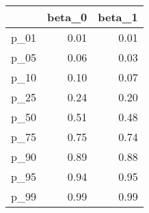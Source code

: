 \begin{table}[ht]
\centering
\begin{tabular}{rrr}
  \hline
 & beta\_0 & beta\_1 \\ 
  \hline
p\_01 & 0.01 & 0.01 \\ 
  p\_05 & 0.06 & 0.03 \\ 
  p\_10 & 0.10 & 0.07 \\ 
  p\_25 & 0.24 & 0.20 \\ 
  p\_50 & 0.51 & 0.48 \\ 
  p\_75 & 0.75 & 0.74 \\ 
  p\_90 & 0.89 & 0.88 \\ 
  p\_95 & 0.94 & 0.95 \\ 
  p\_99 & 0.99 & 0.99 \\ 
   \hline
\end{tabular}
\end{table}
